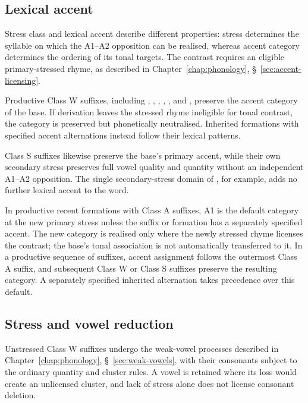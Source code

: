 \subsection{Lexical accent}
\label{sec:derivational-accent}

Stress class and lexical accent describe different properties: stress determines the syllable on which the A1--A2 opposition can be realised, whereas accent category determines the ordering of its tonal targets. The contrast requires an eligible primary-stressed rhyme, as described in Chapter~\ref{chap:phonology}, \S~\ref{sec:accent-licensing}.

Productive Class W suffixes, including , , , , , and , preserve the accent category of the base. If derivation leaves the stressed rhyme ineligible for tonal contrast, the category is preserved but phonetically neutralised. Inherited formations with specified accent alternations instead follow their lexical patterns.

Class S suffixes likewise preserve the base's primary accent, while their own secondary stress preserves full vowel quality and quantity without an independent A1--A2 opposition. The single secondary-stress domain of , for example, adds no further lexical accent to the word.

In productive recent formations with Class A suffixes, A1 is the default category at the new primary stress unless the suffix or formation has a separately specified accent. The new category is realised only where the newly stressed rhyme licenses the contrast; the base's tonal association is not automatically transferred to it. In a productive sequence of suffixes, accent assignment follows the outermost Class A suffix, and subsequent Class W or Class S suffixes preserve the resulting category. A separately specified inherited alternation takes precedence over this default.

\subsection{Stress and vowel reduction}
\label{sec:derivational-reduction}

Unstressed Class W suffixes undergo the weak-vowel processes described in Chapter~\ref{chap:phonology}, \S~\ref{sec:weak-vowels}, with their consonants subject to the ordinary quantity and cluster rules. A vowel is retained where its loss would create an unlicensed cluster, and lack of stress alone does not license consonant deletion.

